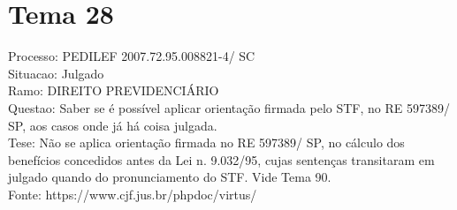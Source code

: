 \documentclass[12pt]{article}
\begin{document}
\section*{Tema 28}
Processo: PEDILEF 2007.72.95.008821-4/ SC\\
Situacao: Julgado\\
Ramo: DIREITO PREVIDENCIÁRIO\\
Questao: Saber se é possível aplicar orientação firmada pelo STF, no RE 597389/ SP, aos casos onde já há coisa julgada.\\
Tese: Não se aplica orientação firmada no RE 597389/ SP, no cálculo dos benefícios concedidos antes da Lei n. 9.032/95, cujas sentenças transitaram em julgado quando do pronunciamento do STF. Vide Tema 90.\\
Fonte: https://www.cjf.jus.br/phpdoc/virtus/
\end{document}
